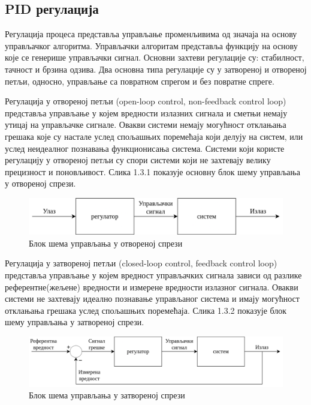 \documentclass[12pt]{article}
\begin{document}
\subsection{PID регулација}
Регулација процеса представља управљање променљивима од значаја на основу управљачког алгоритма. Управљачки алгоритам представља функцију на основу које се генерише управљачки сигнал. Основни захтеви регулације су: стабилност, тачност и брзина одзива. Два основна типа регулације су у затвореној и отвореној петљи, односно, управљање са повратном спрегом и без повратне спреге. 

Регулација у отвореној петљи (open-loop control, non-feedback control loop) представља управљање у којем вредности излазних сигнала и сметњи немају утицај на управљачке сигнале. Овакви системи немају могућност отклањања грешака које су настале услед спољашњих поремећаја који делују на систем, или услед неидеалног познавања функционисања система. Системи који користе регулацију у отвореној петљи су спори системи који не захтевају велику прецизност и поновљивост. Слика 1.3.1 показује основну блок шему управљања у отвореној спрези.

\begin{figure}[H]
    \centering
    \includegraphics[width=14cm]{figures/open_loop.drawio.png}
    \caption{Блок шема управљања у отвореној спрези}
    \label{fig:отворена_спрега}
\end{figure}

Регулација у затвореној петљи (closed-loop control, feedback control loop) представља управљање у којем вредност управљачких сигнала зависи од разлике референтне(жељене) вредности и измерене вредности излазног сигнала. Овакви системи не захтевају идеално познавање управљаног система и имају могућност отклањања грешака услед спољашњих поремећаја. Слика 1.3.2 показује блок шему управљања у затвореној спрези.

\begin{figure}[H]
    \centering
    \includegraphics[width=15cm]{figures/closed_loop.drawio.png}
    \caption{Блок шема управљања у затвореној спрези}
    \label{fig:затворена_спрега}
\end{figure}
\end{document}
